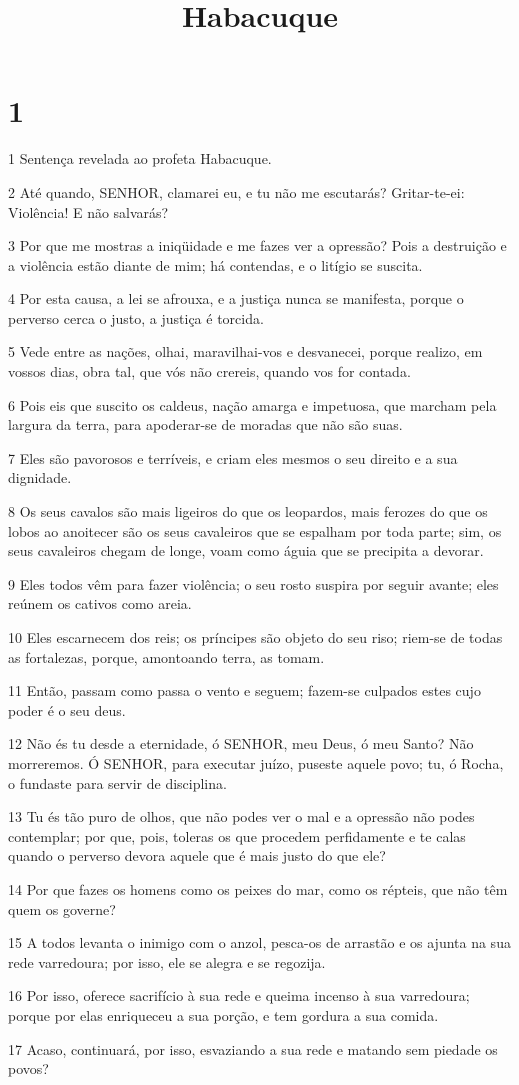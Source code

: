 

\title{Habacuque}


\chapter{1}

\par 1 Sentença revelada ao profeta Habacuque.
\par 2 Até quando, SENHOR, clamarei eu, e tu não me escutarás? Gritar-te-ei: Violência! E não salvarás?
\par 3 Por que me mostras a iniqüidade e me fazes ver a opressão? Pois a destruição e a violência estão diante de mim; há contendas, e o litígio se suscita.
\par 4 Por esta causa, a lei se afrouxa, e a justiça nunca se manifesta, porque o perverso cerca o justo, a justiça é torcida.
\par 5 Vede entre as nações, olhai, maravilhai-vos e desvanecei, porque realizo, em vossos dias, obra tal, que vós não crereis, quando vos for contada.
\par 6 Pois eis que suscito os caldeus, nação amarga e impetuosa, que marcham pela largura da terra, para apoderar-se de moradas que não são suas.
\par 7 Eles são pavorosos e terríveis, e criam eles mesmos o seu direito e a sua dignidade.
\par 8 Os seus cavalos são mais ligeiros do que os leopardos, mais ferozes do que os lobos ao anoitecer são os seus cavaleiros que se espalham por toda parte; sim, os seus cavaleiros chegam de longe, voam como águia que se precipita a devorar.
\par 9 Eles todos vêm para fazer violência; o seu rosto suspira por seguir avante; eles reúnem os cativos como areia.
\par 10 Eles escarnecem dos reis; os príncipes são objeto do seu riso; riem-se de todas as fortalezas, porque, amontoando terra, as tomam.
\par 11 Então, passam como passa o vento e seguem; fazem-se culpados estes cujo poder é o seu deus.
\par 12 Não és tu desde a eternidade, ó SENHOR, meu Deus, ó meu Santo? Não morreremos. Ó SENHOR, para executar juízo, puseste aquele povo; tu, ó Rocha, o fundaste para servir de disciplina.
\par 13 Tu és tão puro de olhos, que não podes ver o mal e a opressão não podes contemplar; por que, pois, toleras os que procedem perfidamente e te calas quando o perverso devora aquele que é mais justo do que ele?
\par 14 Por que fazes os homens como os peixes do mar, como os répteis, que não têm quem os governe?
\par 15 A todos levanta o inimigo com o anzol, pesca-os de arrastão e os ajunta na sua rede varredoura; por isso, ele se alegra e se regozija.
\par 16 Por isso, oferece sacrifício à sua rede e queima incenso à sua varredoura; porque por elas enriqueceu a sua porção, e tem gordura a sua comida.
\par 17 Acaso, continuará, por isso, esvaziando a sua rede e matando sem piedade os povos?

